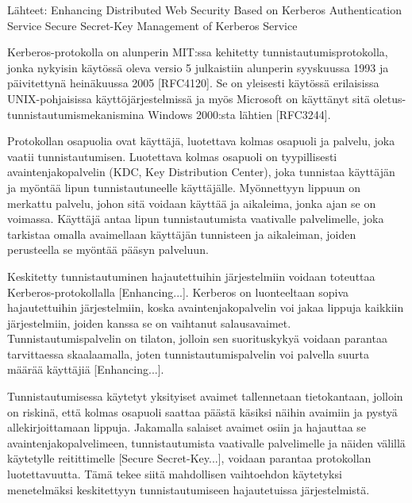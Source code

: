 Lähteet:
Enhancing Distributed Web Security Based on Kerberos Authentication Service
Secure Secret-Key Management of Kerberos Service

Kerberos-protokolla on alunperin MIT:ssa kehitetty tunnistautumisprotokolla, jonka nykyisin käytössä oleva versio 5 julkaistiin alunperin syyskuussa 1993 ja päivitettynä heinäkuussa 2005 [RFC4120]. Se on yleisesti käytössä erilaisissa UNIX-pohjaisissa käyttöjärjestelmissä ja myös Microsoft on käyttänyt sitä oletus-tunnistautumismekanismina Windows 2000:sta lähtien [RFC3244].

Protokollan osapuolia ovat käyttäjä, luotettava kolmas osapuoli ja palvelu, joka vaatii tunnistautumisen. Luotettava kolmas osapuoli on tyypillisesti avaintenjakopalvelin (KDC, Key Distribution Center), joka tunnistaa käyttäjän ja myöntää lipun tunnistautuneelle käyttäjälle. Myönnettyyn lippuun on merkattu palvelu, johon sitä voidaan käyttää ja aikaleima, jonka ajan se on voimassa. Käyttäjä antaa lipun tunnistautumista vaativalle palvelimelle, joka tarkistaa omalla avaimellaan käyttäjän tunnisteen ja aikaleiman, joiden perusteella se myöntää pääsyn palveluun.

Keskitetty tunnistautuminen hajautettuihin järjestelmiin voidaan toteuttaa Kerberos-protokollalla [Enhancing...]. Kerberos on luonteeltaan sopiva hajautettuihin järjestelmiin, koska avaintenjakopalvelin voi jakaa lippuja kaikkiin järjestelmiin, joiden kanssa se on vaihtanut salausavaimet. Tunnistautumispalvelin on tilaton, jolloin sen suorituskykyä voidaan parantaa tarvittaessa skaalaamalla, joten tunnistautumispalvelin voi palvella suurta määrää käyttäjiä [Enhancing...].

Tunnistautumisessa käytetyt yksityiset avaimet tallennetaan tietokantaan, jolloin on riskinä, että kolmas osapuoli saattaa päästä käsiksi näihin avaimiin ja pystyä allekirjoittamaan lippuja. Jakamalla salaiset avaimet osiin ja hajauttaa se avaintenjakopalvelimeen, tunnistautumista vaativalle palvelimelle ja näiden välillä käytetylle reitittimelle [Secure Secret-Key...], voidaan parantaa protokollan luotettavuutta. Tämä tekee siitä mahdollisen vaihtoehdon käytetyksi menetelmäksi keskitettyyn tunnistautumiseen hajautetuissa järjestelmistä.
